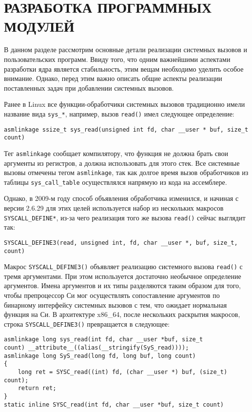 \pagebreak
\section{РАЗРАБОТКА ПРОГРАММНЫХ МОДУЛЕЙ}
\label{sec:dev}

В данном разделе рассмотрим основные детали реализации системных вызовов и
пользовательских программ. Ввиду того, что одним важнейшими аспектами разработки
ядра является стабильность, этим вещам необходимо уделить особое внимание.
Однако, перед этим важно описать общие аспекты реализации поставленных задач при
добавлении системных вызовов.

Ранее в Linux все функции-обработчики системных вызовов традиционно имели
название вида \texttt{sys\_*}, например, вызов \texttt{read()} имел следующее
определение:
\medskip
\begin{lstlisting}[style=cstyle]
asmlinkage ssize_t sys_read(unsigned int fd, char __user * buf, size_t count)
\end{lstlisting}
\medskip

Тег \texttt{asmlinkage} сообщает компилятору, что функция не должна брать свои
аргументы из регистров, а должна использовать для этого стек. Все системные
вызовы отмечены тегом \texttt{asmlinkage}, так как долгое время вызов
обработчиков из таблицы \texttt{sys\_call\_table} осуществлялся напрямую из кода
на ассемблере.

Однако, в 2009-м году способ объявления обработчика изменился, и начиная с
версии 2.6.29 для этих целей используется набор из нескольких макросов
\texttt{SYSCALL\_DEFINE*}, из-за чего реализация того же вызова \texttt{read()}
сейчас выглядит так:
\medskip
\begin{lstlisting}[style=cstyle]
SYSCALL_DEFINE3(read, unsigned int, fd, char __user *, buf, size_t, count)
\end{lstlisting}
\medskip

Макрос \texttt{SYSCALL\_DEFINE3()} объявляет реализацию системного вызова
\texttt{read()} с тремя аргументами. При этом используется достаточно необычное
определение аргументов. Имена аргументов и их типы разделяются таким образом для
того, чтобы препроцессор Си мог осуществлять сопоставление аргументов по
бинарному интерфейсу системных вызовов с тем, что ожидает нормальная функция на
Си. В архитектуре x86\_64, после нескольких раскрытия макросов, строка
\texttt{SYSCALL\_DEFINE3()} превращается в следующее:
\medskip
\begin{lstlisting}[style=cstyle]
asmlinkage long sys_read(int fd, char __user *buf, size_t
count) __attribute__((alias(__stringify(SyS_read))));
asmlinkage long SyS_read(long fd, long buf, long count)
{
	long ret = SYSC_read((int) fd, (char __user *) buf, (size_t) count);
	return ret;
}
static inline SYSC_read(int fd, char __user *buf, size_t count)
\end{lstlisting}
\medskip

